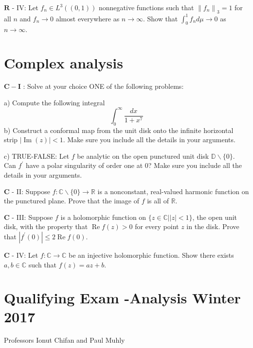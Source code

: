 \documentclass[10pt]{article}
\begin{document}
$\mathbf{R}$ - IV: Let $f_{n} \in L^{3}((0,1))$ nonnegative functions such that $\left\|f_{n}\right\|_{3}=1$ for all $n$ and $f_{n} \rightarrow 0$ almost everywhere as $n \rightarrow \infty$. Show that $\int_{0}^{1} f_{n} d \mu \rightarrow 0$ as $n \rightarrow \infty$.

\section{Complex analysis}
$\mathbf{C}-\mathbf{I}$ : Solve at your choice ONE of the following problems:

a) Compute the following integral
$$
\int_{0}^{\infty} \frac{d x}{1+x^{7}}
$$
b) Construct a conformal map from the unit disk onto the infinite horizontal strip $|\operatorname{Im}(z)|<1$. Make sure you include all the details in your arguments.

c) TRUE-FALSE: Let $f$ be analytic on the open punctured unit disk $\mathbb{D} \backslash\{0\}$. Can $f^{\prime}$ have a polar singularity of order one at 0? Make sure you include all the details in your arguments.

$\mathbf{C}$ - II: Suppose $f: \mathbb{C} \backslash\{0\} \rightarrow \mathbb{R}$ is a nonconstant, real-valued harmonic function on the punctured plane. Prove that the image of $f$ is all of $\mathbb{R}$.

$\mathbf{C}$ - III: Suppose $f$ is a holomorphic function on $\{z \in \mathbb{C}|| z \mid<1\}$, the open unit disk, with the property that $\operatorname{Re} f(z)>0$ for every point $z$ in the disk. Prove that $\left|f^{\prime}(0)\right| \leq 2 \operatorname{Re} f(0)$.

$\mathbf{C}$ - IV: Let $f: \mathbb{C} \rightarrow \mathbb{C}$ be an injective holomorphic function. Show there exists $a, b \in \mathbb{C}$ such that $f(z)=a z+b .$

\section{Qualifying Exam -Analysis 
 Winter 2017}
Professors Ionut Chifan and Paul Muhly
\end{document}
